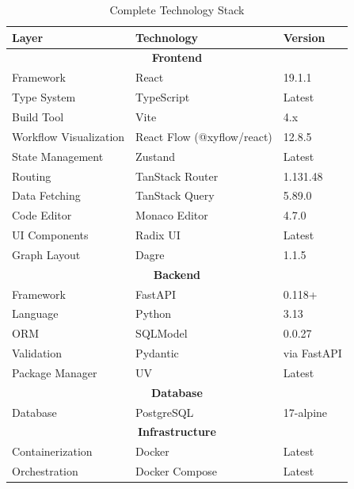 \documentclass[12pt]{article}
\begin{document}
\begin{table}[h]
\centering
\caption{Complete Technology Stack}
\label{tab:tech_stack}
\begin{tabular}{|l|l|l|}
\hline
\textbf{Layer} & \textbf{Technology} & \textbf{Version} \\
\hline
\multicolumn{3}{|c|}{\textbf{Frontend}} \\
\hline
Framework & React & 19.1.1 \\
Type System & TypeScript & Latest \\
Build Tool & Vite & 4.x \\
Workflow Visualization & React Flow (@xyflow/react) & 12.8.5 \\
State Management & Zustand & Latest \\
Routing & TanStack Router & 1.131.48 \\
Data Fetching & TanStack Query & 5.89.0 \\
Code Editor & Monaco Editor & 4.7.0 \\
UI Components & Radix UI & Latest \\
Graph Layout & Dagre & 1.1.5 \\
\hline
\multicolumn{3}{|c|}{\textbf{Backend}} \\
\hline
Framework & FastAPI & 0.118+ \\
Language & Python & 3.13 \\
ORM & SQLModel & 0.0.27 \\
Validation & Pydantic & via FastAPI \\
Package Manager & UV & Latest \\
\hline
\multicolumn{3}{|c|}{\textbf{Database}} \\
\hline
Database & PostgreSQL & 17-alpine \\
\hline
\multicolumn{3}{|c|}{\textbf{Infrastructure}} \\
\hline
Containerization & Docker & Latest \\
Orchestration & Docker Compose & Latest \\
\hline
\end{tabular}
\end{table}
\end{document}
